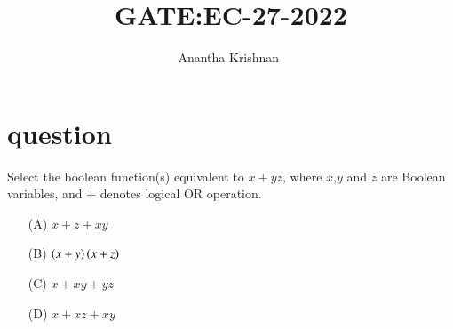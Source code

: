 \documentclass[journal,12pt,onecolumn]{IEEEtran}
\theoremstyle{remark}
\begin{document}

\vspace{3cm}

\title{GATE:EC-27-2022}
\author{Anantha Krishnan $^{}$%
}
\maketitle
\bigskip



\section{question}
Select the boolean function(s) equivalent to $x+yz$, where $x$,$y$ and $z$ are Boolean variables, and $+$ denotes logical OR operation.
\begin{enumerate}
    \item [(A)] $x+z+xy$
    \item [(B)] $\left(x+y\right)\left(x+z\right)$
    \item [(C)] $x+xy+yz$
    \item [(D)] $x+xz+xy$
\end{enumerate}
 
\end{document}
